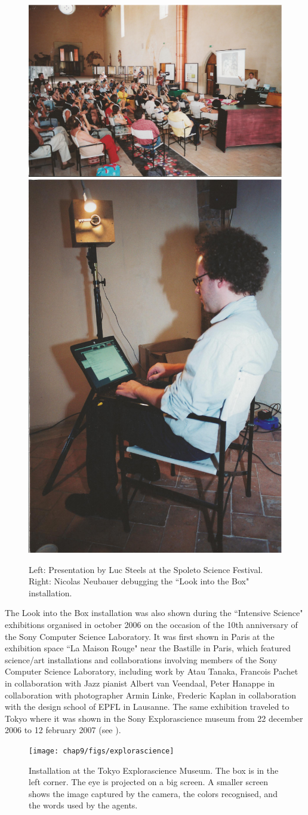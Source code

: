 \begin{figure}[htbp]
  \centerline{\includegraphics[width=.65\textwidth]{chap9/figs/ital-talk}
\includegraphics[width=.30\textwidth]{chap9/figs/ital2}}
\caption{\label{fig:spoleto} 
Left: Presentation by Luc Steels at the Spoleto Science Festival. Right: Nicolas Neubauer debugging 
the ``Look into the Box" installation.
 }
\end{figure}

The Look into the Box installation was also shown during the ``Intensive Science" exhibitions organised in october 
2006 on the occasion of the 10th anniversary of the Sony Computer Science Laboratory.
It was first shown in Paris at 
the exhibition space ``La Maison Rouge" near the Bastille in Paris, which featured science/art installations 
and collaborations involving members of the Sony Computer Science Laboratory, including work by Atau Tanaka, 
Francois Pachet in collaboration with Jazz pianist Albert van Veendaal, Peter Hanappe in collaboration with 
photographer Armin Linke, Frederic Kaplan in collaboration with the design school of EPFL in Lausanne. 
The same exhibition traveled to Tokyo where it was shown in the Sony Explorascience museum from 22 december 2006 
to 12 february 2007 (see ). 
\begin{figure}[htbp]
  \centerline{\texttt{[image: chap9/figs/explorascience]}}
\caption{\label{fig:intensive-science} 
Installation at the Tokyo Explorascience Museum. The box is in the left corner. The eye is projected on a 
big screen. A smaller screen shows the image captured by the camera, the colors recognised, and the words used by 
the agents.}
\end{figure}
